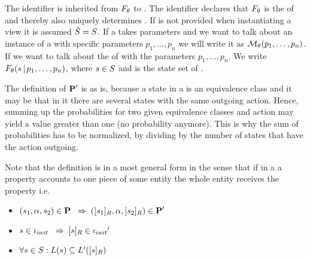 \documentclass[preview]{standalone}
\begin{document}
The identifier \viewppty is inherited from ${F_{{\theta}}}$ to \view. The identifier declares that ${F_{{\theta}}}$ is the \grpfctN of \view and thereby also uniquely determines \view. If \smstates is not provided when instantiating a view it is assumed ${\tilde{{S}}} = {S}$. If a \viewN takes parameters and we want to talk about an instance of a \viewN with specific parameters $p_1, \dots, p_n$ we will write it as ${{{{\mathcal{M}}}}_{{\theta}}}(p_1, \dots, p_n)$. If we want to talk about the \grpfctN \grpfct of \view with the parameters $p_1, \dots, p_n$. We write ${F_{{\theta}}}({s} {\,|\,} p_1, \dots, p_n)$, where ${s} \in {S}$ and \states is the state set of \chgph. 

The definition of ${{\textbf{P}}}'$ is as is, because a state in a \viewN is an equivalence class and it may be that in it there are several states with the same outgoing action. Hence, summing up the probabilities for two given equivalence classes and action \action may yield a value greater than one (no probability anymore). This is why the sum of  probabilities has to be normalized, by dividing by the number of states that have the action \action outgoing. 

Note that the definition is in a most general form in the sense that if in a \viewN a property accounts to one piece of some entity the whole entity receives the property i.e. 
\begin{itemize}	
	\item $({s}_1, {\alpha}, {s}_2) \in {\ensuremath{{\textbf{P}}}} {\hspace{3mm}\Rightarrow\hspace{2mm}} ({{[{s}_1]_{{R}}}}, {\alpha}, {{[{s}_2]_{{R}}}}) \in {\ensuremath{{\textbf{P}}}}'$
	\item ${s} \in {\ensuremath{{\iota_{init}}}} {\hspace{3mm}\Rightarrow\hspace{2mm}} {\ensuremath{{[{s}]_{{R}}}}} \in {\iota_{init}}'$
	\item $\forall {s} \in {S} : {L}({s}) \subseteq {L}'({{[{s}]_{{R}}}})$
\end{itemize}
\end{document}
